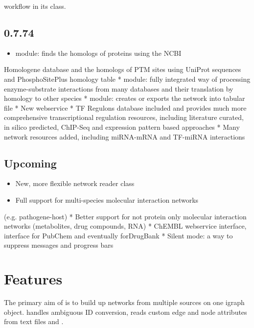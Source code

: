\documentclass[letterpaper,10pt,english]{sphinxmanual}
\begin{document}
workflow in its  class.


\section{0.7.74}
\label{\detokenize{changelog:id6}}\begin{itemize}
\item {} 
 module: finds the homologs of proteins using the NCBI

\end{itemize}

Homologene database and the homologs of PTM sites using UniProt sequences
and PhosphoSitePlus homology table
*  module: fully integrated way of processing enzyme-substrate
interactions from many databases and their translation by homology to other
species
*  module: creates  or exports the network into
tabular file
* New webservice
* TF Regulons database included and provides much more comprehensive
transcriptional regulation resources, including literature curated, in silico
predicted, ChIP-Seq and expression pattern based approaches
* Many network resources added, including miRNA-mRNA and TF-miRNA interactions


\section{Upcoming}
\label{\detokenize{changelog:upcoming}}\begin{itemize}
\item {} 
New, more flexible network reader class

\item {} 
Full support for multi-species molecular interaction networks

\end{itemize}

(e.g. pathogene-host)
* Better support for not protein only molecular interaction networks
(metabolites, drug compounds, RNA)
* ChEMBL webservice interface, interface for PubChem and eventually
forDrugBank
* Silent mode: a way to suppress messages and progress bars


\chapter{Features}
\label{\detokenize{index:features}}
The primary aim of  is to build up networks from multiple sources on
one igraph object.  handles ambiguous ID conversion, reads custom
edge and node attributes from text files and .
\end{document}
